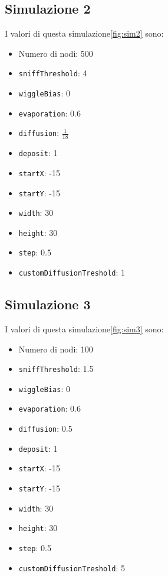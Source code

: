 \subsection{Simulazione 2}
I valori di questa simulazione\space \cref{fig:sim2} sono:
\begin{itemize}
    \item Numero di nodi: 500
    \item \texttt{sniffThreshold}: 4
    \item \texttt{wiggleBias}: 0
    \item \texttt{evaporation}: 0.6
    \item \texttt{diffusion}: $\frac{1}{18}$
    \item \texttt{deposit}: 1
    \item \texttt{startX}: -15
    \item \texttt{startY}: -15
    \item \texttt{width}: 30
    \item \texttt{height}: 30
    \item \texttt{step}: 0.5
    \item \texttt{customDiffusionTreshold}: 1
\end{itemize}

\subsection{Simulazione 3}
I valori di questa simulazione\space \cref{fig:sim3} sono:
\begin{itemize}
    \item Numero di nodi: 100
    \item \texttt{sniffThreshold}: 1.5
    \item \texttt{wiggleBias}: 0
    \item \texttt{evaporation}: 0.6
    \item \texttt{diffusion}: 0.5
    \item \texttt{deposit}: 1
    \item \texttt{startX}: -15
    \item \texttt{startY}: -15
    \item \texttt{width}: 30
    \item \texttt{height}: 30
    \item \texttt{step}: 0.5
    \item \texttt{customDiffusionTreshold}: 5
\end{itemize}
